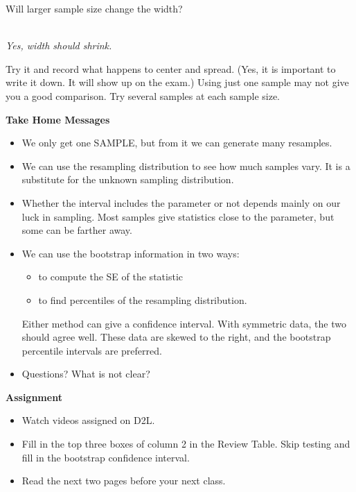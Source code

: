 \begin{enumerate}
   Will larger sample size  change the width?\\
\begin{students}
        \vspace{.5cm}        
\end{students}
\begin{key}
\\ {\it Yes, width should shrink.}
\end{key}

   Try it and record what happens to center and spread.  (Yes, it is
   important to write it down. It will show up on the exam.)  Using
   just one sample may not give you a good comparison.  Try several
   samples at each sample size. 
   \vfill
\end{enumerate}

\begin{center}
  {\bf Take Home Messages}
\end{center}
\begin{itemize}
  \item   We only get one SAMPLE, but from it we can generate many
    resamples.
  \item We can use the resampling distribution to see how much
    samples vary. It is a substitute for the unknown sampling
    distribution.
  \item Whether the interval includes the parameter or not
    depends mainly on our luck in sampling.  Most samples give statistics
    close to the parameter, but some can be farther away.
  \item We can use the bootstrap information in two ways:
    \begin{itemize}
    \item to compute the SE of the statistic
    \item to find percentiles of the resampling distribution.
    \end{itemize}
   Either method can give a confidence interval.  With symmetric data, the
   two should agree well.  These data are skewed to the right, and the
   bootstrap percentile intervals are preferred.
 \item 
  Questions?  What is not clear?\vfill
  \end{itemize}
  

\noindent
{\bf Assignment} \vspace{-.2in}
\begin{itemize}
\item Watch videos assigned on D2L.
 \item Fill in the top three boxes of column 2 in the Review
   Table. Skip testing and fill in the bootstrap confidence interval. 
\item Read the next two pages before your next class.
\end{itemize}

